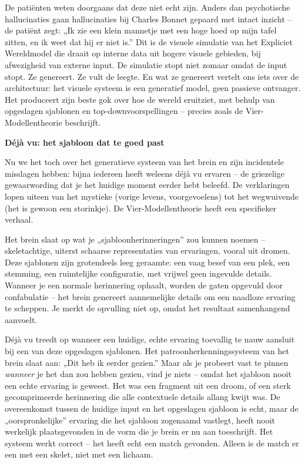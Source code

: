 \documentclass[11pt, twoside, openright]{book}
\begin{document}
De patiënten weten doorgaans dat deze niet echt zijn. Anders dan psychotische hallucinaties gaan hallucinaties bij Charles Bonnet gepaard met intact inzicht -- de patiënt zegt: „Ik zie een klein mannetje met een hoge hoed op mijn tafel zitten, en ik weet dat hij er niet is.” Dit is de visuele simulatie van het Expliciet Wereldmodel die draait op interne data uit hogere visuele gebieden, bij afwezigheid van externe input. De simulatie stopt niet zomaar omdat de input stopt. Ze genereert. Ze vult de leegte. En wat ze genereert vertelt ons iets over de architectuur: het visuele systeem is een generatief model, geen passieve ontvanger. Het produceert zijn beste gok over hoe de wereld eruitziet, met behulp van opgeslagen sjablonen en top-downvoorspellingen -- precies zoals de Vier-Modellentheorie beschrijft.

\textbf{Déjà vu: het sjabloon dat te goed past}

Nu we het toch over het generatieve systeem van het brein en zijn incidentele misslagen hebben: bijna iedereen heeft weleens déjà vu ervaren -- de griezelige gewaarwording dat je het huidige moment eerder hebt beleefd. De verklaringen lopen uiteen van het mystieke (vorige levens, voorgevoelens) tot het wegwuivende (het is gewoon een storinkje). De Vier-Modellentheorie heeft een specifieker verhaal.

Het brein slaat op wat je „sjabloonherinneringen” zou kunnen noemen -- skeletachtige, uiterst schaarse representaties van ervaringen, vooral uit dromen. Deze sjablonen zijn grotendeels leeg geraamte: een vaag besef van een plek, een stemming, een ruimtelijke configuratie, met vrijwel geen ingevulde details. Wanneer je een normale herinnering ophaalt, worden de gaten opgevuld door confabulatie -- het brein genereert aannemelijke details om een naadloze ervaring te scheppen. Je merkt de opvulling niet op, omdat het resultaat samenhangend aanvoelt.

Déjà vu treedt op wanneer een huidige, echte ervaring toevallig te nauw aansluit bij een van deze opgeslagen sjablonen. Het patroonherkenningssysteem van het brein slaat aan: „Dit heb ik eerder gezien.” Maar als je probeert vast te pinnen \textit{wanneer} je het dan zou hebben gezien, vind je niets -- omdat het sjabloon nooit een echte ervaring is geweest. Het was een fragment uit een droom, of een sterk gecomprimeerde herinnering die alle contextuele details allang kwijt was. De overeenkomst tussen de huidige input en het opgeslagen sjabloon is echt, maar de „oorspronkelijke” ervaring die het sjabloon zogenaamd vastlegt, heeft nooit werkelijk plaatsgevonden in de vorm die je brein er nu aan toeschrijft. Het systeem werkt correct -- het heeft echt een match gevonden. Alleen is de match er een met een skelet, niet met een lichaam.
\end{document}
